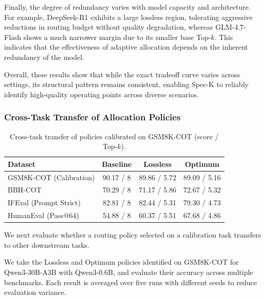 \documentclass[conference]{IEEEtran}
\theoremstyle{definition} %
\begin{document}
Finally, the degree of redundancy varies with model capacity and architecture. 
For example, DeepSeek-R1 exhibits a large lossless region, tolerating aggressive reductions in routing budget without quality degradation, whereas GLM-4.7-Flash shows a much narrower margin due to its smaller base Top-$k$. 
This indicates that the effectiveness of adaptive allocation depends on the inherent redundancy of the model.

Overall, these results show that while the exact tradeoff curve varies across settings, its structural pattern remains consistent, enabling Spec-K to reliably identify high-quality operating points across diverse scenarios.

\subsubsection{Cross-Task Transfer of Allocation Policies}

\begin{table}[t]
\centering
\setlength{\tabcolsep}{7pt}
\renewcommand{\arraystretch}{1.3}
\caption{Cross-task transfer of policies calibrated on GSM8K-COT (score / Top-$k$).}
\label{tab:transfer_accuracy}
\begin{tabular}{lccc}
\toprule
\textbf{Dataset} & \textbf{Baseline} & \textbf{Lossless} & \textbf{Optimum} \\
\midrule
GSM8K-COT {\scriptsize (Calibration)} & 90.17 / 8 & 89.86 / 5.72 & 89.09 / 5.16 \\

BBH-COT & 70.29 / 8 & 71.17 / 5.86 & 72.67 / 5.32 \\

IFEval {\scriptsize (Prompt Strict)} & 82.81 / 8 & 82.44 / 5.31 & 79.30 / 4.73 \\

HumanEval {\scriptsize (Pass@64)} & 54.88 / 8 & 60.37 / 5.51 & 67.68 / 4.86 \\

\bottomrule
\end{tabular}
\end{table}

We next evaluate whether a routing policy selected on a calibration task transfers to other downstream tasks.

We take the Lossless and Optimum policies identified on GSM8K-COT for Qwen3-30B-A3B with Qwen3-0.6B, and evaluate their accuracy across multiple benchmarks. 
Each result is averaged over five runs with different seeds to reduce evaluation variance.
\end{document}
